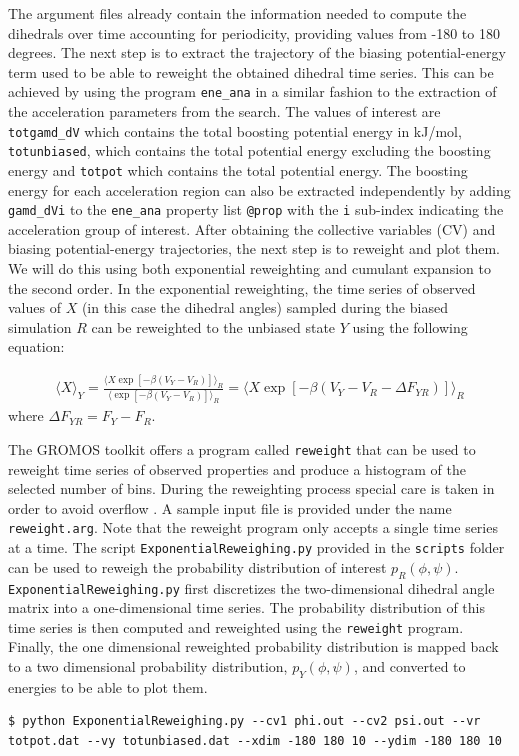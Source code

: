 The argument files already contain the information needed to compute the dihedrals over time accounting for periodicity, providing values from -180 to 180 degrees.
The next step is to extract the trajectory of the biasing potential-energy term used to be able to reweight the obtained dihedral time series. This can be achieved by using the program \texttt{ene\_ana} in a similar fashion to the extraction of the acceleration parameters from the search. The values of interest are \texttt{totgamd\_dV} which contains the total boosting potential energy in kJ/mol, \texttt{totunbiased}, which contains the total potential energy excluding the boosting energy and \texttt{totpot} which contains the total potential energy. The boosting energy for each acceleration region can also be extracted independently by adding \texttt{gamd\_dVi} to the \texttt{ene\_ana} property list \texttt{@prop} with the \texttt{i} sub-index indicating the acceleration group of interest.
After obtaining the collective variables (CV) and biasing potential-energy trajectories, the next step is to reweight and plot them. We will do this using both exponential reweighting and cumulant expansion to the second order.
In the exponential reweighting, the time series of observed values of $X$ (in this case the dihedral angles) sampled during the biased simulation $R$ can be reweighted to the unbiased state $Y$ using the following equation:

\begin{equation}
  \begin{aligned}
 \langle X \rangle_Y = \frac {\langle X \exp \left[-\beta \left (V_Y - V_R \right) \right] \rangle_R} {\langle \exp \left[-\beta \left (V_Y - V_R \right) \right] \rangle_R} = \langle X \exp \left[-\beta \left (V_Y - V_R -\Delta F_{YR} \right) \right] \rangle_R
\end{aligned}
\end{equation}
where $\Delta F_{YR} = F_{Y} - F_{R}$.

The GROMOS toolkit offers a program called \texttt{reweight} that can be used to reweight time series of observed properties and produce a histogram of the selected number of bins. During the reweighting process special care is taken in order to avoid overflow \cite{berg2003multicanonical}. A sample input file is provided under the name \texttt{reweight.arg}. Note that the reweight program only accepts a single time series at a time. The script \texttt{ExponentialReweighing.py} provided in the \texttt{scripts} folder can be used to reweigh the probability distribution of interest $p_{R}(\phi, \psi)$. \texttt{ExponentialReweighing.py} first discretizes the two-dimensional dihedral angle matrix into a one-dimensional time series. The probability distribution of this time series is then computed and reweighted using the \texttt{reweight} program. Finally, the one dimensional reweighted probability distribution is mapped back to a two dimensional probability distribution, $p_{Y}(\phi, \psi)$, and converted to energies to be able to plot them.
 \begin{lstlisting}
$ python ExponentialReweighing.py --cv1 phi.out --cv2 psi.out --vr totpot.dat --vy totunbiased.dat --xdim -180 180 10 --ydim -180 180 10
\end{lstlisting}

